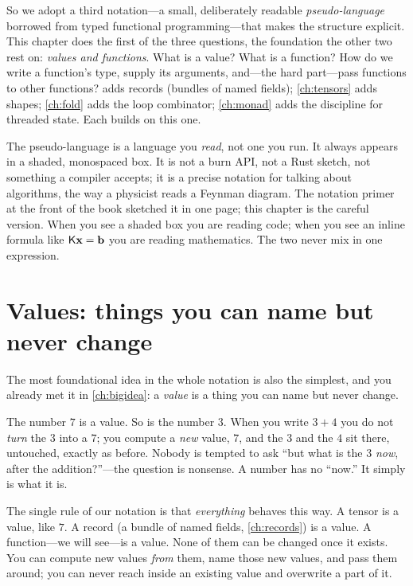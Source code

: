 So we adopt a third notation---a small, deliberately readable \emph{pseudo-language}
borrowed from typed functional programming---that makes the structure
explicit. This chapter does the first of the three questions, the foundation the
other two rest on: \emph{values and functions}. What is a value? What is a
function? How do we write a function's type, supply its arguments, and---the
hard part---pass functions to other functions?  adds records
(bundles of named fields); \cref{ch:tensors} adds shapes; \cref{ch:fold} adds
the loop combinator; \cref{ch:monad} adds the discipline for threaded state. Each
builds on this one.

\begin{notationbox}
The pseudo-language is a language you \emph{read}, not one you run. It always
appears in a shaded, monospaced box. It is not a burn API, not a Rust sketch, not
something a compiler accepts; it is a precise notation for talking about
algorithms, the way a physicist reads a Feynman diagram. The notation primer at
the front of the book sketched it in one page; this chapter is the careful
version. When you see a shaded box you are reading code; when you see an inline
formula like $\mathsf{K}\mathbf{x}=\mathbf{b}$ you are reading mathematics. The two never mix in
one expression.
\end{notationbox}

\section{Values: things you can name but never change}

The most foundational idea in the whole notation is also the simplest, and you
already met it in \cref{ch:bigidea}: a \emph{value} is a thing you can name but
never change.

The number $7$ is a value. So is the number $3$. When you write $3 + 4$ you do not
\emph{turn} the $3$ into a $7$; you compute a \emph{new} value, $7$, and the $3$
and the $4$ sit there, untouched, exactly as before. Nobody is tempted to ask
``but what is the $3$ \emph{now}, after the addition?''---the question is
nonsense. A number has no ``now.'' It simply is what it is.

The single rule of our notation is that \emph{everything} behaves this way. A
tensor is a value, like $7$. A record (a bundle of named fields, \cref{ch:records})
is a value. A function---we will see---is a value. None of them can be changed
once it exists. You can compute new values \emph{from} them, name those new
values, and pass them around; you can never reach inside an existing value and
overwrite a part of it.


